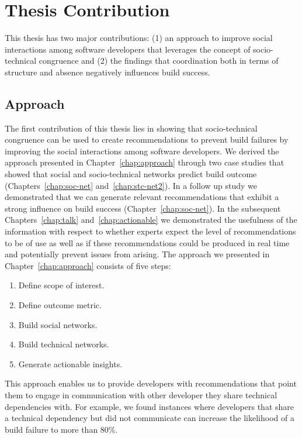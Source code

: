 \section{Thesis Contribution}
This thesis has two major contributions: (1) an approach to improve social interactions among software developers that leverages the concept of socio-technical congruence and (2)
the findings that coordination both in terms of structure and absence negatively influences build success.

\subsection{Approach}
The first contribution of this thesis lies in showing that socio-technical congruence can be used to create recommendations to prevent build failures by improving the social interactions among software developers.
We derived the approach presented in Chapter~\ref{chap:approach} through two case studies that showed that social and socio-technical networks predict build outcome (Chapters~\ref{chap:soc-net} and~\ref{chap:stc-net2}).
In a follow up study we demonstrated that we can generate relevant recommendations that exhibit a strong influence on build success (Chapter~\ref{chap:soc-net}).
In the subsequent Chapters~\ref{chap:talk} and~\ref{chap:actionable} we demonstrated the usefulness of the information with respect to whether experts expect the level of recommendations to be of use as well as if these recommendations could be produced in real time and potentially prevent issues from arising.
The approach we presented in Chapter~\ref{chap:approach} consists of five steps:

\begin{enumerate}
\item Define scope of interest.
\item Define outcome metric.
\item Build social networks.
\item Build technical networks.
\item Generate actionable insights.
\end{enumerate}

This approach enables us to provide developers with recommendations that point them to engage in communication with other developer they share technical dependencies with.
For example, we found instances where developers that share a technical dependency but did not communicate can increase the likelihood of a build failure to more than 80\%.


